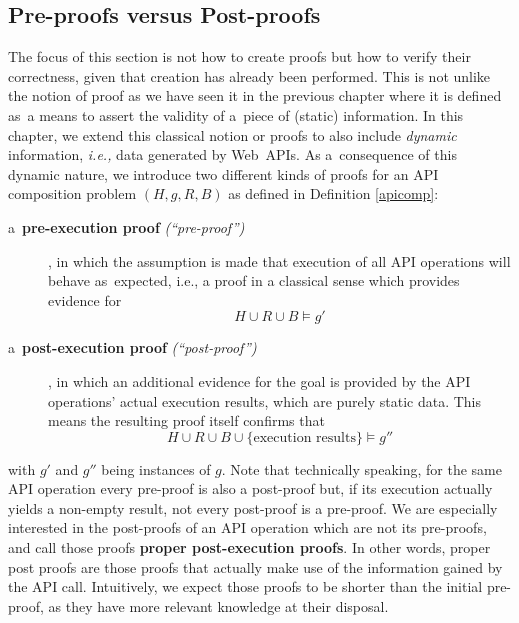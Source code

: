 \subsection{Pre-proofs versus Post-proofs}
\label{sec:PrePostProof}
The focus of this section is not how to create proofs
but how to verify their correctness,
given that creation has already been performed.
This is not unlike the notion of proof 
% 
as we have seen it in the previous chapter
where it is defined as~a means to assert the validity of a~piece of (static) information.
In this chapter, we extend this classical notion or proofs
to also include \emph{dynamic} information,
{\it i.e.,} data generated by Web~APIs.
As a~consequence of this dynamic nature,
we introduce two different kinds of proofs for an API composition problem $(H, g, R, B)$ as defined in Definition \ref{apicomp}:


\begin{description}
\item [a~{\bf pre-execution proof} \emph{(``pre-proof'')}]\hspace{-1ex},
      in which the assumption is made that execution of all API operations
      will behave as~expected, i.e., a proof in a classical sense which provides evidence for
      \[ H\cup R \cup B \models g'\]
\item [a~{\bf post-execution proof} \emph{(``post-proof'')}]\hspace{-1ex},
      in which an additional evidence for the goal %
      is provided by
      the API operations' actual execution results,
      which are purely static data. 
      This means 
      the resulting proof itself confirms that %
      \[H \cup R \cup B \cup \{\text{execution results}\} \models g'' \]
\end{description}
with $g'$ and $g''$ being instances of $g$.
Note that technically speaking,
for the same API operation every pre-proof is also a post-proof but,
if its execution actually yields a non-empty result,
not every post-proof is a pre-proof.
We are especially interested in the post-proofs of an API operation which are not its pre-proofs,
and call those proofs
\textbf{proper post-execution proofs}.
In other words, proper post proofs are those proofs
that actually make use of the information gained by the API call.
Intuitively, we expect those proofs to be shorter than the initial pre-proof,
as they have more relevant knowledge at their disposal.

